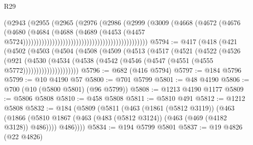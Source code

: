 \begin{lexlean}{R29}
\begin{coremodule}
                                                                  (@2943
                                                                    (@2955
                                                                      (@2965
                                                                        (@2976
                                                                          (@2986
                                                                            (@2999
                                                                              (@3009
                                                                                (@4668
                                                                                  (@4672
                                                                                    (@4676
                                                                                      (@4680
                                                                                        (@4684
                                                                                          (@4688
                                                                                            (@4689
                                                                                              (@4453
                                                                                                (@4457
                                                                                                  @5724)))))))))))))))))))))))))))))))))))))))))))))))
@5794 := @417
    (@418
      (@421
        (@4502
          (@4503
            (@4504
              (@4508
                (@4509
                  (@4513
                    (@4517
                      (@4521
                        (@4522
                          (@4526
                            (@921
                              (@4530
                                (@4534
                                  (@4538
                                    (@4542 (@4546 (@4547 (@4551 (@4555 @5772)))))))))))))))))))))
@5796 := @682 (@416 @5794)
@5797 := @184 @5796
@5799 := @10 @4190 @57
@5800 := @701 @5799
@5801 := @48 @4190
@5806 := @700 (@10 (@5800 @5801) (@96 @5799))
@5808 := @1213 @4190 @1177
@5809 := @5806 @5808
@5810 := @458 @5808
@5811 := @5810 @491
@5812 := @1212 @5808
@5832 := @184
    (@5809
      (@5811
        (@463
          (@1861 (@5812 @3119))
          (@463
            (@1866 (@5810 @1867 (@463 (@483 (@5812 @3124)) (@463 (@469 (@4182 @3128)) @486))))
            @486))))
@5834 := @194 @5799 @5801
@5837 := @19 @4826 (@22 @4826)

\end{coremodule}
\end{lexlean}

